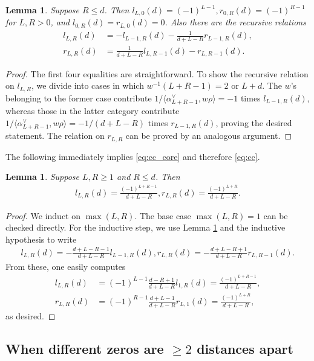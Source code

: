 \documentclass[11pt]{amsart}
\newtheorem{lemma}[theorem]{Lemma}
\numberwithin{theorem}{section}
\numberwithin{equation}{section}
\theoremstyle{remark}
\theoremstyle{definition}
\begin{document}
{\begin{lemma}\label{lemma:cc1}
Suppose $R \leq d$. Then
$l_{L,0}(d)=(-1)^{L-1}, r_{0,R}(d)=(-1)^{R-1}$ for $L,R>0$, and $l_{0,R}(d)=r_{L,0}(d)=0$. Also there are the recursive relations
\begin{align*}
l_{L,R}(d) &= -l_{L-1,R}(d)-\frac{1}{d+L-R}r_{L-1,R}(d), \\
r_{L,R}(d) &= \frac{1}{d+L-R}l_{L,R-1}(d)-r_{L,R-1}(d).
\end{align*}
\end{lemma}
\begin{proof}
The first four equalities are straightforward. To show the recursive relation on $l_{L,R}$, we divide into cases in which $w^{-1}(L+R-1) = 2$ or $L+d$. The $w$'s belonging to the former case contribute $1/\langle \alpha^\vee_{L+R-1},w\rho \rangle=-1$ times $l_{L-1,R}(d)$, whereas those in the latter category contribute $1/\langle \alpha^\vee_{L+R-1},w\rho \rangle = -1/(d+L-R)$ times $r_{L-1,R}(d)$, proving the desired statement. The relation on $r_{L,R}$ can be proved by an analogous argument.
\end{proof}

The following immediately implies \eqref{eq:cc_core} and therefore \eqref{eq:cc}.
\begin{lemma}\label{lemma:cc2}
Suppose $L,R\geq 1$ and $R \leq d$. Then
\begin{align*}
l_{L,R}(d) = \frac{(-1)^{L+R-1}}{d+L-R}, r_{L,R}(d) = \frac{(-1)^{L+R}}{d+L-R}.
\end{align*}
\end{lemma}
\begin{proof}
We induct on $\max(L,R)$. The base case $\max(L,R)=1$ can be checked directly. For the inductive step, we use Lemma \ref{lemma:cc1} and the inductive hypothesis to write
\begin{align*}
l_{L,R}(d) = -\frac{d+L-R-1}{d+L-R}l_{L-1,R}(d), r_{L,R}(d) = -\frac{d+L-R+1}{d+L-R}r_{L,R-1}(d).
\end{align*}
From these, one easily computes
\begin{align*}
l_{L,R}(d) &= (-1)^{L-1}\frac{d-R+1}{d+L-R}l_{1,R}(d)=\frac{(-1)^{L+R-1}}{d+L-R},\\
r_{L,R}(d) &= (-1)^{R-1}\frac{d+L-1}{d+L-R}r_{L,1}(d) =\frac{(-1)^{L+R}}{d+L-R},
\end{align*}
as desired.
\end{proof}



\subsection{When different zeros are $\geq 2$ distances apart}

}
\end{document}
